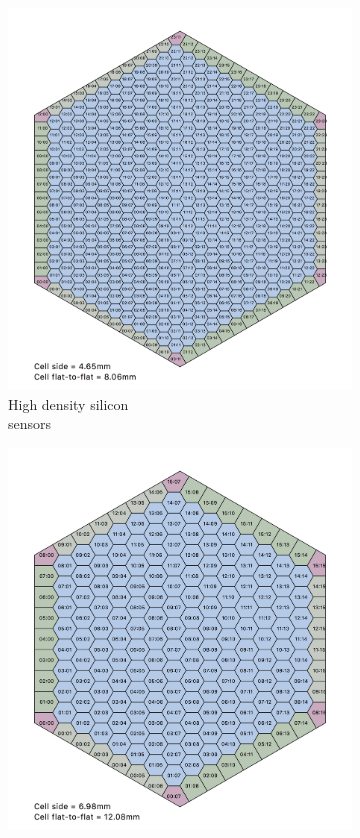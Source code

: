 \begin{figure}[H]
    \centering
    \begin{subfigure}[t]{0.3\textwidth}
    \includegraphics[width=\textwidth]{media/high_density_cells.png}
    \caption{High density silicon \\ sensors}
    \end{subfigure}
    \begin{subfigure}[t]{0.3\textwidth}
    \includegraphics[width=\textwidth]{media/low_density_cells.png}

\end{subfigure}
\end{figure}
